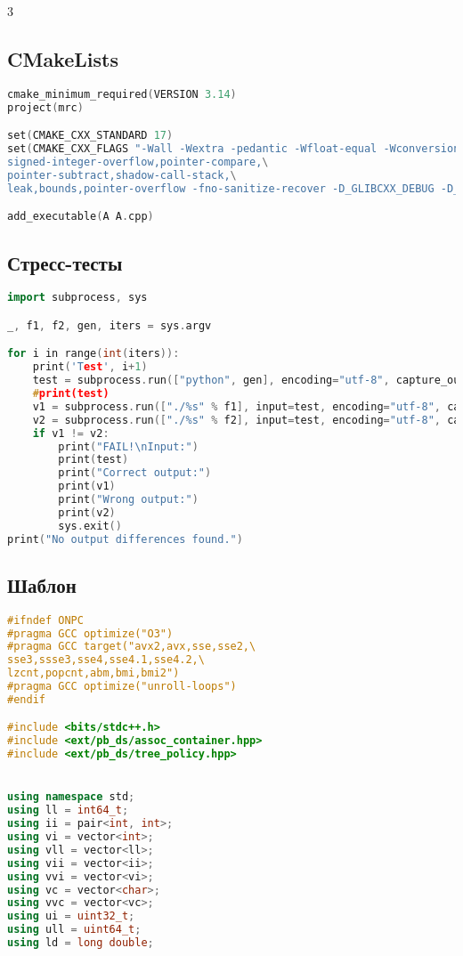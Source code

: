 \documentclass[10pt,a4paper,landscape,twosided]{extarticle}
\begin{document}
\begin{multicols}{3}
\subsection{CMakeLists}
\begin{lstlisting}[language=C++]
cmake_minimum_required(VERSION 3.14)
project(mrc)

set(CMAKE_CXX_STANDARD 17)
set(CMAKE_CXX_FLAGS "-Wall -Wextra -pedantic -Wfloat-equal -Wconversion -Wlogical-op -Wshift-overflow=2 -fsanitize=address,undefined,\
signed-integer-overflow,pointer-compare,\
pointer-subtract,shadow-call-stack,\
leak,bounds,pointer-overflow -fno-sanitize-recover -D_GLIBCXX_DEBUG -D_GLIBCXX_DEBUG_PEDANTIC -DONPC")

add_executable(A A.cpp)
\end{lstlisting}

\subsection{Стресс-тесты}
\begin{lstlisting}[language=C++]
import subprocess, sys

_, f1, f2, gen, iters = sys.argv

for i in range(int(iters)):
    print('Test', i+1)
    test = subprocess.run(["python", gen], encoding="utf-8", capture_output=True).stdout
    #print(test)
    v1 = subprocess.run(["./%s" % f1], input=test, encoding="utf-8", capture_output=True).stdout
    v2 = subprocess.run(["./%s" % f2], input=test, encoding="utf-8", capture_output=True).stdout
    if v1 != v2:
        print("FAIL!\nInput:")
        print(test)
        print("Correct output:")
        print(v1)
        print("Wrong output:")
        print(v2)
        sys.exit()
print("No output differences found.")
\end{lstlisting}

\subsection{Шаблон}
\begin{lstlisting}[language=C++]
#ifndef ONPC
#pragma GCC optimize("O3")
#pragma GCC target("avx2,avx,sse,sse2,\
sse3,ssse3,sse4,sse4.1,sse4.2,\
lzcnt,popcnt,abm,bmi,bmi2")
#pragma GCC optimize("unroll-loops")
#endif

#include <bits/stdc++.h>
#include <ext/pb_ds/assoc_container.hpp>
#include <ext/pb_ds/tree_policy.hpp>


using namespace std;
using ll = int64_t;
using ii = pair<int, int>;
using vi = vector<int>;
using vll = vector<ll>;
using vii = vector<ii>;
using vvi = vector<vi>;
using vc = vector<char>;
using vvc = vector<vc>;
using ui = uint32_t;
using ull = uint64_t;
using ld = long double;


\end{lstlisting}
\end{multicols}
\end{document}
